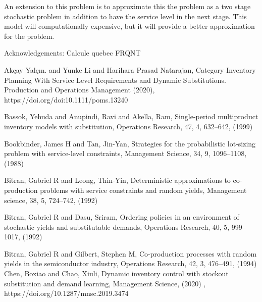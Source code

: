 \documentclass[10pt]{article}
\begin{document}
An extension to this problem is to approximate this the problem as a two stage stochastic problem in addition to have the service level in the next stage. This model will computationally expensive, but it will provide a better approximation for the problem.

Acknowledgements:
Calcule quebec
FRQNT


\begin{thebibliography}{99}







Akçay Yalçın. and Yunke Li and Harihara Prasad Natarajan, Category Inventory Planning With
Service Level Requirements and Dynamic Substitutions.
Production and Operations Management (2020), https://doi.org/doi:10.1111/poms.13240

Bassok, Yehuda and Anupindi, Ravi and Akella, Ram,
Single-period multiproduct inventory models with substitution, Operations Research, 47, 4, 632--642, (1999)
 

 Bookbinder, James H and Tan, Jin-Yan, Strategies for the probabilistic lot-sizing problem with service-level constraints, Management Science, 34, 9, 1096--1108,
 (1988)


Bitran, Gabriel R and Leong, Thin-Yin, Deterministic approximations to co-production problems with service constraints and random yields, Management science, 38, 5, 724--742, (1992)
  
  
Bitran, Gabriel R and Dasu, Sriram, Ordering policies in an environment of stochastic yields and substitutable demands,
Operations Research,
40, 5,
999--1017, (1992)

Bitran, Gabriel R and Gilbert, Stephen M,
  Co-production processes with random yields in the semiconductor industry, Operations Research, 42, 3, 476--491, (1994)
Chen, Boxiao and Chao, Xiuli, Dynamic inventory control with stockout substitution and demand learning, Management Science, (2020) , https://doi.org/10.1287/mnsc.2019.3474


\end{thebibliography}
\end{document}
